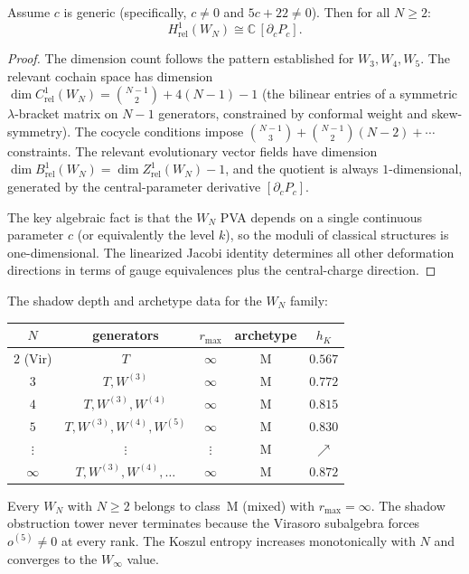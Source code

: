 \begin{proposition}
Assume $c$ is generic (specifically, $c \neq 0$ and $5c+22 \neq 0$).
Then for all $N \ge 2$:
\[
H^1_{\mathrm{rel}}(W_N) \cong \mathbb{C}\,[\partial_c P_c].
\]
\end{proposition}

\begin{proof}
The dimension count follows the pattern established for $W_3, W_4, W_5$.
The relevant cochain space has dimension
$\dim C^1_{\mathrm{rel}}(W_N) = \binom{N-1}{2} + 4(N-1) - 1$
(the bilinear entries of a symmetric $\lambda$-bracket matrix on
$N-1$ generators, constrained by conformal weight and skew-symmetry).
The cocycle conditions impose
$\binom{N-1}{3} + \binom{N-1}{2}(N-2) + \cdots$
constraints. The relevant evolutionary vector fields have dimension
$\dim B^1_{\mathrm{rel}}(W_N) = \dim Z^1_{\mathrm{rel}}(W_N) - 1$,
and the quotient is always $1$-dimensional, generated by the
central-parameter derivative $[\partial_c P_c]$.

The key algebraic fact is that the $W_N$ PVA depends on a single
continuous parameter $c$ (or equivalently the level $k$), so the
moduli of classical structures is one-dimensional. The linearized
Jacobi identity determines all other deformation directions in terms
of gauge equivalences plus the central-charge direction.
\end{proof}

\begin{computation}
The shadow depth and archetype data for the $W_N$ family:

\smallskip
\begin{center}
\begin{tabular}{c c c c c}
$N$ & generators & $r_{\max}$ & archetype & $h_K$ \\
\hline
$2$ (Vir) & $T$ & $\infty$ & M & $0.567$ \\
$3$ & $T, W^{(3)}$ & $\infty$ & M & $0.772$ \\
$4$ & $T, W^{(3)}, W^{(4)}$ & $\infty$ & M & $0.815$ \\
$5$ & $T, W^{(3)}, W^{(4)}, W^{(5)}$ & $\infty$ & M & $0.830$ \\
$\vdots$ & $\vdots$ & $\vdots$ & M & $\nearrow$ \\
$\infty$ & $T, W^{(3)}, W^{(4)}, \dots$ & $\infty$ & M & $0.872$
\end{tabular}
\end{center}

\smallskip
\noindent
Every $W_N$ with $N \ge 2$ belongs to class~M (mixed) with
$r_{\max} = \infty$. The shadow obstruction tower never terminates because the
Virasoro subalgebra forces $o^{(5)} \neq 0$ at every rank. The Koszul
entropy increases monotonically with $N$ and converges to the
$W_\infty$ value.
\end{computation}


